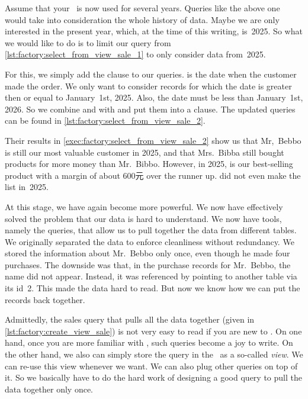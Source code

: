 Assume that your \db\ is now used for several years.
Queries like the above one would take into consideration the whole history of data.
Maybe we are only interested in the present year, which, at the time of this writing, is~2025.
So what we would like to do is to limit our query from \cref{lst:factory:select_from_view_sale_1} to only consider data from~2025.%
%
\begin{sloppypar}%
For this, we simply add the clause  to our queries.
 is the date when the customer made the order.
We only want to consider records for which the date is greater then or equal to January~1st, 2025.
Also, the date must be less than January~1st, 2026.
So we combine  and  with  and put them into a  clause.
The updated queries can be found in \cref{lst:factory:select_from_view_sale_2}.%
\end{sloppypar}%
%
Their results in \cref{exec:factory:select_from_view_sale_2} show us that Mr,~Bebbo is still our most valuable customer in 2025, and that Mrs.~Bibba still bought products for more money than Mr.~Bibbo.
However, in 2025,  is our best-selling product with a margin of about 600元 over the runner up.
 did not even make the list in~2025.

At this stage, we have again become more powerful.
We now have effectively solved the problem that our data is hard to understand.
We now have tools, namely the  queries, that allow us to pull together the data from different tables.
We originally separated the data to enforce cleanliness without redundancy.
We stored the information about Mr.~Bebbo only once, even though he made four purchases.
The downside was that, in the purchase records for Mr.~Bebbo, the name  did not appear.
Instead, it was referenced by pointing to another table via its id~2.
This made the data hard to read.
But now we know how we can put the records back together.

Admittedly, the sales query that pulls all the data together (given in \cref{lst:factory:create_view_sale}) is not very easy to read if you are new to \sql.
On one hand, once you are more familiar with \sql, such queries become a joy to write.
On the other hand, we also can simply store the query in the \db\ as a so-called \emph{view}.
We can re-use this view whenever we want.
We can also plug other queries on top of it.
So we basically have to do the hard work of designing a good query to pull the data together only once.%
%
\FloatBarrier%
\endhsection%
\endhsection%
%
